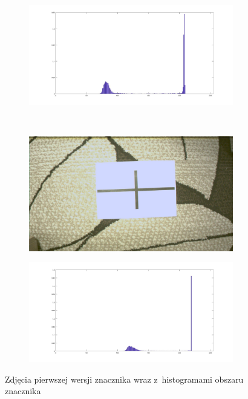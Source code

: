 \begin{figure}
\begin{subfigure}{0.4\textwidth}
		\caption{}
		\label{fig:osw2}
	\end{subfigure}
	\begin{subfigure}{0.55\textwidth}
		\centering
		\includegraphics[width=0.98\textwidth]{bw_hist2.jpg}
		\caption{}
		\label{fig:bw_hist2}
	\end{subfigure}\\
	\begin{subfigure}{0.4\textwidth}
		\centering
		\includegraphics[width=0.98\textwidth]{rgb_jasny.jpg}
		\caption{}
		\label{fig:osw3}
	\end{subfigure}
	\begin{subfigure}{0.55\textwidth}
		\centering
		\includegraphics[width=0.98\textwidth]{bw_hist3.jpg}
		\caption{}
		\label{fig:bw_hist3}
	\end{subfigure}
	\caption{Zdjęcia pierwszej wersji znacznika wraz z~histogramami obszaru znacznika}
	\label{fig:zdjecia_wejsciowe}
\end{figure}

